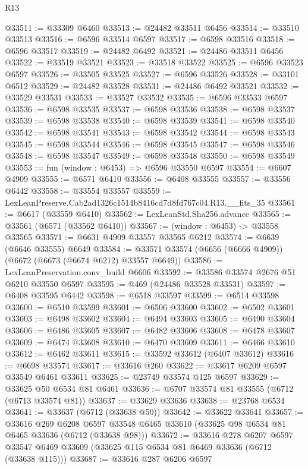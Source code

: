 \begin{lexlean}{R13}
\begin{coremodule}
@33511 := @33309 @6460
@33513 := @24482 @33511 @6456
@33514 := @33510 @33513
@33516 := @6596 @33514 @6597
@33517 := @6598 @33516
@33518 := @6596 @33517
@33519 := @24482 @6492
@33521 := @24486 @33511 @6456
@33522 := @33519 @33521
@33523 := @33518 @33522
@33525 := @6596 @33523 @6597
@33526 := @33505 @33525
@33527 := @6596 @33526
@33528 := @33101 @6512
@33529 := @24482 @33528
@33531 := @24486 @6492 @33521
@33532 := @33529 @33531
@33533 := @33527 @33532
@33535 := @6596 @33533 @6597
@33536 := @6598 @33535
@33537 := @6598 @33536
@33538 := @6598 @33537
@33539 := @6598 @33538
@33540 := @6598 @33539
@33541 := @6598 @33540
@33542 := @6598 @33541
@33543 := @6598 @33542
@33544 := @6598 @33543
@33545 := @6598 @33544
@33546 := @6598 @33545
@33547 := @6598 @33546
@33548 := @6598 @33547
@33549 := @6598 @33548
@33550 := @6598 @33549
@33553 := fun (window : @6453) => @6596 @33550 @6597
@33554 := @6607 @4909
@33555 := @6571 @6410
@33556 := @6408 @33555
@33557 := @33556 @6442
@33558 := @33554 @33557
@33559 := LexLeanPreserve.Cab2ad1326c1514b8416cd7d8fd767c04.R13.__fits_35
@33561 := @6617 (@33559 @6410)
@33562 := LexLeanStd.Sha256.advance
@33565 := @33561 (@6571 (@33562 @6410))
@33567 := (window : @6453) -> @33558 @33565
@33571 := @6631 @4909 @33557 @33565 @6212
@33574 := @6639 (@6646 @33555) @6649
@33584 := @33571 @33574 (@6656 (@6666 @4909)) (@6672 (@6673 (@6674 @6212) @33557 @6649))
@33586 := LexLeanPreservation.conv_build @6606
@33592 := @33586 @33574 @2676 @51 @6210 @33550 @6597
@33595 := @469 (@24486 @33528 @33531)
@33597 := @6408 @33595 @6442
@33598 := @6518 @33597
@33599 := @6514 @33598
@33600 := @6510 @33599
@33601 := @6506 @33600
@33602 := @6502 @33601
@33603 := @6498 @33602
@33604 := @6494 @33603
@33605 := @6490 @33604
@33606 := @6486 @33605
@33607 := @6482 @33606
@33608 := @6478 @33607
@33609 := @6474 @33608
@33610 := @6470 @33609
@33611 := @6466 @33610
@33612 := @6462 @33611
@33615 := @33592 @33612 (@6407 @33612)
@33616 := @6698 @33574
@33617 := @33616 @260
@33622 := @33617 @6209 @6597 @33549 @6461 @33611
@33625 := @23749 @33574 @125 @6597
@33629 := @33625 @50 @6534 @81 @6461
@33636 := @6707 @33574 @81 @33555 (@6712 (@6713 @33574 @81))
@33637 := @33629 @33636
@33638 := @23768 @6534
@33641 := @33637 (@6712 (@33638 @50))
@33642 := @33622 @33641
@33657 := @33616
    @269
    @6208
    @6597
    @33548
    @6465
    @33610
    (@33625 @98 @6534 @81 @6465 @33636 (@6712 (@33638 @98)))
@33672 := @33616
    @278
    @6207
    @6597
    @33547
    @6469
    @33609
    (@33625 @115 @6534 @81 @6469 @33636 (@6712 (@33638 @115)))
@33687 := @33616
    @287
    @6206
    @6597

\end{coremodule}
\end{lexlean}
